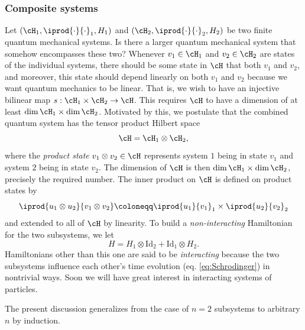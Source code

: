 \subsubsection{Composite systems} \label{subsubsec:composite_systems}
Let $(\cH_1, \iprod{\cdot}{\cdot}_1, H_1)$ and $(\cH_2, \iprod{\cdot}{\cdot}_2, H_2)$ be two finite quantum mechanical systems. Is there a larger quantum mechanical system that somehow encompasses these two? Whenever $v_1 \in \cH_1$ and $v_2 \in \cH_2$ are states of the individual systems, there should be some state in $\cH$ that  both $v_1$ and $v_2$, and moreover, this state should depend linearly on both $v_1$ and $v_2$ because we want quantum mechanics to be linear. That is, we wish to have an injective bilinear map $s: \cH_1 \times \cH_2 \to \cH$. This requires $\cH$ to have a dimension of at least $\dim \cH_1 \times \dim \cH_2$. Motivated by this, we postulate that the combined quantum system has the tensor product Hilbert space
\begin{equation}
    \cH = \cH_1 \otimes \cH_2,
\end{equation}
where the \emph{product state} $v_1 \otimes v_2 \in \cH$ represents system $1$ being in state $v_1$ and system $2$ being in state $v_2$. The dimension of $\cH$ is then $\dim \cH_1 \times \dim \cH_2$, precisely the required number. The inner product on $\cH$ is defined on product states by
\begin{equation}
    \iprod{u_1 \otimes u_2}{v_1 \otimes v_2} \coloneqq \iprod{u_1}{v_1}_1 \times \iprod{u_2}{v_2}_2
\end{equation}
and extended to all of $\cH$ by linearity. To build a \emph{non-interacting} Hamiltonian for the two subsystems, we let
\begin{equation} \label{eq:non_interacting_Hamiltonian}
    H = H_1 \otimes \text{Id}_2 + \text{Id}_1 \otimes H_2.
\end{equation}
Hamiltonians other than this one are said to be \emph{interacting} because the two subsystems influence each other's time evolution (eq. \ref{eq:Schrodinger}) in nontrivial ways. Soon we will have great interest in interacting systems of particles.

The present discussion generalizes from the case of $n = 2$ subsystems to arbitrary $n$ by induction.

